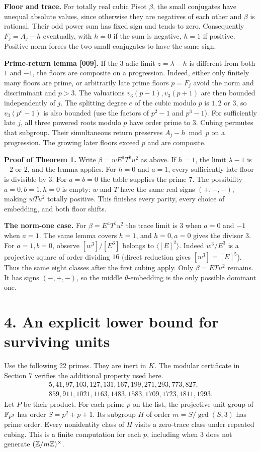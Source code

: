 \documentclass[11pt,a4paper,oneside,openany]{book}
\newcommand{\lead}[1]{\textbf{#1}\enspace}\let\para\lead
\newcommand{\localhead}[1]{\needspace{5\baselineskip}\section*{\color{ink}#1}}
\let\sect\localhead\let\secx\localhead\let\head\localhead
\begin{document}
\lead{Floor and trace.} For totally real cubic Pisot $\beta$, the small conjugates have unequal absolute values, since otherwise they are negatives of each other and $\beta$ is rational. Their odd power sum has fixed sign and tends to zero. Consequently $F_j=A_j-h$ eventually, with $h=0$ if the sum is negative, $h=1$ if positive. Positive norm forces the two small conjugates to have the same sign.

\lead{Prime-return lemma [009].} If the $3$-adic limit $z=\lambda-h$ is different from both $1$ and $-1$, the floors are composite on a progression. Indeed, either only finitely many floors are prime, or arbitrarily late prime floors $p=F_j$ avoid the norm and discriminant and $p>3$. The valuations $v_3(p-1),v_3(p+1)$ are then bounded independently of $j$. The splitting degree $e$ of the cubic modulo $p$ is $1,2$ or $3$, so $v_3(p^e-1)$ is also bounded (use the factors of $p^2-1$ and $p^3-1$). For sufficiently late $j$, all three powered roots modulo $p$ have order prime to $3$. Cubing permutes that subgroup. Their simultaneous return preserves $A_j-h\bmod p$ on a progression. The growing later floors exceed $p$ and are composite.

\lead{Proof of Theorem 1.} Write $\beta=wE^aT^bu^2$ as above. If $h=1$, the limit $\lambda-1$ is $-2$ or $2$, and the lemma applies. For $h=0$ and $a=1$, every sufficiently late floor is divisible by $3$. For $a=b=0$ the table supplies the prime $7$. The possibility $a=0,b=1,h=0$ is empty: $w$ and $T$ have the same real signs $(+,-,-)$, making $wTu^2$ totally positive. This finishes every parity, every choice of embedding, and both floor shifts.

\lead{The norm-one case.} For $\beta=E^aT^bu^2$ the trace limit is $3$ when $a=0$ and $-1$ when $a=1$. The same lemma covers $h=1$, and $h=0,a=0$ gives the divisor $3$. For $a=1,b=0$, observe $[w^3]/[E^3]$ belongs to $\langle[E]^2\rangle$. Indeed $w^3/E^3$ is a projective square of order dividing $16$ (direct reduction gives $[w^3]=[E]^5$). Thus the same eight classes after the first cubing apply. Only $\beta=ETu^2$ remains. It has signs $(-,+,-)$, so the middle $\theta$-embedding is the only possible dominant one.



\sect{4. An explicit lower bound for surviving units}
Use the following 22 primes. They are inert in $K$. The modular certificate in Section 7 verifies the additional property used here.
\[
\begin{gathered}
5,41,97,103,127,131,167,199,271,293,773,827,\\
859,911,1021,1163,1483,1583,1709,1723,1811,1993 .
\end{gathered}
\]
Let $P$ be their product. For each prime $p$ on the list, the projective unit group of $\mathbb F_{p^3}$ has order $S=p^2+p+1$. Its subgroup $H$ of order $m=S/\gcd(S,3)$ has prime order. Every nonidentity class of $H$ visits a zero-trace class under repeated cubing. This is a finite computation for each $p$, including when $3$ does not generate $(\mathbb Z/m\mathbb Z)^\times$.
\end{document}
